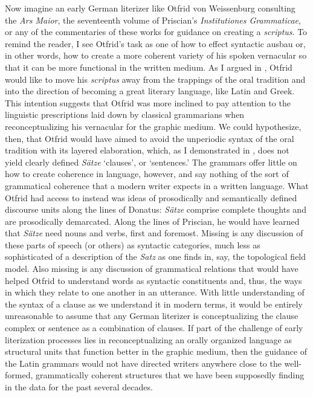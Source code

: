 Now imagine an early German literizer like Otfrid von Weissenburg consulting the \textit{Ars Maior}, the seventeenth volume of Priscian’s \textit{Institutiones Grammaticae}, or any of the commentaries of these works for guidance on creating a \textit{scriptus}. To remind the reader, I see Otfrid’s task as one of how to effect syntactic ausbau or, in other words, how to create a more coherent variety of his spoken vernacular so that it can be more functional in the written medium. As I argued in , Otfrid would like to move his \textit{scriptus} away from the trappings of the oral tradition and into the direction of becoming a great literary language, like Latin and Greek. This intention suggests that Otfrid was more inclined to pay attention to the linguistic prescriptions laid down by classical grammarians when reconceptualizing his vernacular for the graphic medium. We could hypothesize, then, that Otfrid would have aimed to avoid the unperiodic syntax of the oral tradition with its layered elaboration, which, as I demonstrated in , does not yield clearly defined \textit{Sätze} ‘clauses', or ‘sentences.’ The grammars offer little on how to create coherence in language, however, and say nothing of the sort of grammatical coherence that a modern writer expects in a written language. What Otfrid had access to instead was ideas of prosodically and semantically defined discourse units along the lines of Donatus: \textit{Sätze} comprise complete thoughts and are prosodically demarcated. Along the lines of Priscian, he would have learned that \textit{Sätze} need nouns and verbs, first and foremost. Missing is any discussion of these parts of speech (or others) as syntactic categories, much less as sophisticated of a description of the \textit{Satz} as one finds in, say, the topological field model. Also missing is any discussion of grammatical relations that would have helped Otfrid to understand words as syntactic constituents and, thus, the ways in which they relate to one another in an utterance. With little understanding of the syntax of a clause as we understand it in modern terms, it would be entirely unreasonable to assume that any German literizer is conceptualizing the clause complex or sentence as a combination of clauses. If part of the challenge of early literization processes lies in reconceptualizing an orally organized language as structural units that function better in the graphic medium, then the guidance of the Latin grammars would not have directed writers anywhere close to the well-formed, grammatically coherent structures that we have been supposedly finding in the data for the past several decades.


